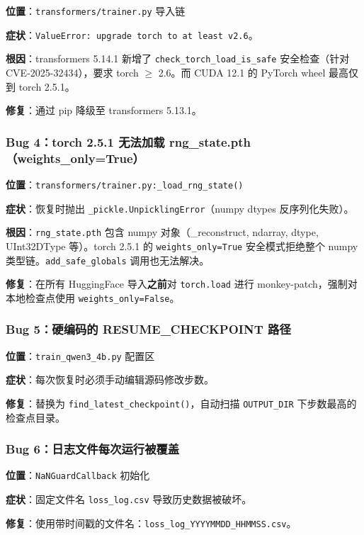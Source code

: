 \documentclass[12pt,a4paper]{ctexart}
\begin{document}
\textbf{位置}：\texttt{transformers/trainer.py} 导入链

\textbf{症状}：\texttt{ValueError: upgrade torch to at least v2.6}。

\textbf{根因}：transformers 5.14.1 新增了 \texttt{check\_torch\_load\_is\_safe} 安全检查（针对 CVE-2025-32434），要求 torch $\ge$ 2.6。而 CUDA 12.1 的 PyTorch wheel 最高仅到 torch 2.5.1。

\textbf{修复}：通过 pip 降级至 transformers 5.13.1。

\subsubsection*{Bug 4：torch 2.5.1 无法加载 rng\_state.pth（weights\_only=True）}

\textbf{位置}：\texttt{transformers/trainer.py:\_load\_rng\_state()}

\textbf{症状}：恢复时抛出 \texttt{\_pickle.UnpicklingError}（numpy dtypes 反序列化失败）。

\textbf{根因}：\texttt{rng\_state.pth} 包含 numpy 对象（\_reconstruct, ndarray, dtype, UInt32DType 等）。torch 2.5.1 的 \texttt{weights\_only=True} 安全模式拒绝整个 numpy 类型链。\texttt{add\_safe\_globals} 调用也无法解决。

\textbf{修复}：在所有 HuggingFace 导入\textbf{之前}对 \texttt{torch.load} 进行 monkey-patch，强制对本地检查点使用 \texttt{weights\_only=False}。

\subsubsection*{Bug 5：硬编码的 RESUME\_CHECKPOINT 路径}

\textbf{位置}：\texttt{train\_qwen3\_4b.py} 配置区

\textbf{症状}：每次恢复时必须手动编辑源码修改步数。

\textbf{修复}：替换为 \texttt{find\_latest\_checkpoint()}，自动扫描 \texttt{OUTPUT\_DIR} 下步数最高的检查点目录。

\subsubsection*{Bug 6：日志文件每次运行被覆盖}

\textbf{位置}：\texttt{NaNGuardCallback} 初始化

\textbf{症状}：固定文件名 \texttt{loss\_log.csv} 导致历史数据被破坏。

\textbf{修复}：使用带时间戳的文件名：\texttt{loss\_log\_YYYYMMDD\_HHMMSS.csv}。
\end{document}
